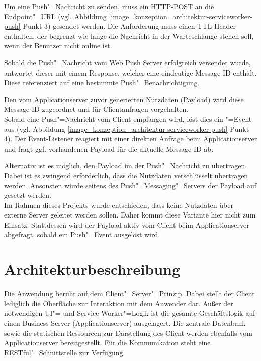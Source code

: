 Um eine Push"=Nachricht zu senden, muss ein HTTP-POST an die Endpoint"=URL (vgl. Abbildung \ref{image_konzeption_architektur-serviceworker-push} Punkt 3) gesendet werden. Die Anforderung muss einen TTL-Header enthalten, der begrenzt wie lange die Nachricht in der Warteschlange stehen soll, wenn der Benutzer nicht online ist.

Sobald die Push"=Nachricht vom Web Push Server erfolgreich versendet wurde, antwortet dieser mit einem Response, welcher eine eindeutige Message ID enthält. Diese referenziert auf eine bestimmte Push"=Benachrichtigung.

Den vom Applicationserver zuvor generierten Nutzdaten (Payload) wird diese Message ID zugeordnet und für Clientanfragen vorgehalten. \\
Sobald eine Push"=Nachricht vom Client empfangen wird, löst dies ein "=Event aus (vgl. Abbildung \ref{image_konzeption_architektur-serviceworker-push} Punkt 4). Der Event-Listener reagiert mit einer direkten Anfrage beim Applicationserver und fragt ggf. vorhandenen Payload für die aktuelle Message ID ab.

Alternativ ist es möglich, den Payload im  der Push"=Nachricht zu übertragen. Dabei ist es zwingend erforderlich, dass die Nutzdaten verschlüsselt übertragen werden. Ansonsten würde seitens des Push"=Messaging"=Servers der Payload auf  gesetzt werden. \\
Im Rahmen dieses Projekts wurde entschieden, dass keine Nutzdaten über \glqq externe\grqq{} Server geleitet werden sollen. Daher kommt diese Variante hier nicht zum Einsatz. Stattdessen wird der Payload aktiv vom Client beim Applicationserver abgefragt, sobald ein Push"=Event ausgelöst wird. 

\section{Architekturbeschreibung}
\label{sec_konzeption_serviceworker_architektur}

Die Anwendung beruht auf dem Client"=Server"=Prinzip. Dabei stellt der Client lediglich die Oberfläche zur Interaktion mit dem Anwender dar. Außer der notwendigen UI"= und Service Worker"=Logik ist die gesamte Geschäftslogik auf einen Business-Server (Applicationserver) ausgelagert. Die zentrale Datenbank sowie die statischen Ressourcen zur Darstellung des Client werden ebenfalls vom Applicationserver bereitgestellt. Für die Kommunikation steht eine RESTful"=Schnittstelle zur Verfügung.

